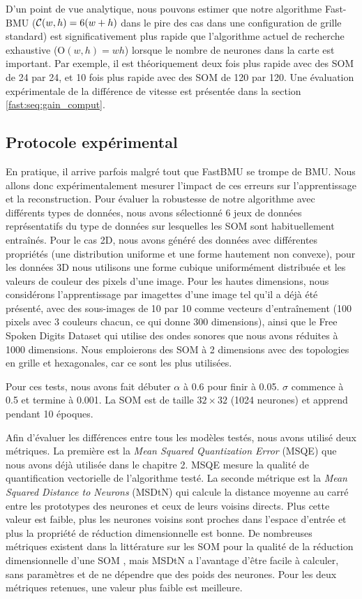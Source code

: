 	D'un point de vue analytique, nous pouvons estimer que notre algorithme Fast-BMU (${\cal C}(w,h)=6(w+h)$ dans le pire des cas dans une configuration de grille standard) est significativement plus rapide que l'algorithme actuel de recherche exhaustive (O$(w,h) = wh$) lorsque le nombre de neurones dans la carte est important. Par exemple, il est théoriquement deux fois plus rapide avec des SOM de 24 par 24, et 10 fois plus rapide avec des SOM de 120 par 120. Une évaluation expérimentale de la différence de vitesse est présentée dans la section \ref{fast:seq:gain_comput}.

	\subsection{Protocole expérimental}\label{seq:exp}

	En pratique, il arrive parfois malgré tout que FastBMU se trompe de BMU. Nous allons donc expérimentalement mesurer l'impact de ces erreurs sur l'apprentissage et la reconstruction. Pour évaluer la robustesse de notre algorithme avec différents types de données, nous avons sélectionné 6 jeux de données représentatifs du type de données sur lesquelles les SOM sont habituellement entraînés. Pour le cas 2D, nous avons généré des données avec différentes propriétés (une distribution uniforme et une forme hautement non convexe), pour les données 3D nous utilisons une forme cubique uniformément distribuée et les valeurs de couleur des pixels d'une image. Pour les hautes dimensions, nous considérons l'apprentissage par imagettes d'une image tel qu'il a déjà été présenté, avec des sous-images de 10 par 10 comme vecteurs d'entraînement (100 pixels avec 3 couleurs chacun, ce qui donne 300 dimensions), ainsi que le Free Spoken Digits Dataset \cite{zohar_jackson_2018_1342401} qui utilise des ondes sonores que nous avons réduites à 1000 dimensions. Nous emploierons des SOM à 2 dimensions avec des topologies en grille et hexagonales, car ce sont les plus utilisées.

	Pour ces tests, nous avons fait débuter $\alpha$ à 0.6 pour finir à 0.05. $\sigma$ commence à 0.5 et termine à 0.001. La SOM est de taille $32\times32$ (1024 neurones) et apprend pendant 10 époques.

	Afin d'évaluer les différences entre tous les modèles testés, nous avons utilisé deux métriques. La première est la \textit{Mean Squared Quantization Error} (MSQE) que nous avons déjà utilisée dans le chapitre 2. MSQE mesure la qualité de quantification vectorielle de l'algorithme testé. La seconde métrique est la \textit{Mean Squared Distance to Neurons} (MSDtN) qui calcule la distance moyenne au carré entre les prototypes des neurones et ceux de leurs voisins directs. Plus cette valeur est faible, plus les neurones voisins sont proches dans l'espace d'entrée et plus la propriété de réduction dimensionnelle est bonne. De nombreuses métriques existent dans la littérature sur les SOM pour la qualité de la réduction dimensionnelle d'une SOM \cite{polzlbauer2004survey}, mais MSDtN a l'avantage d'être facile à calculer, sans paramètres et de ne dépendre que des poids des neurones. Pour les deux métriques retenues, une valeur plus faible est meilleure. 

